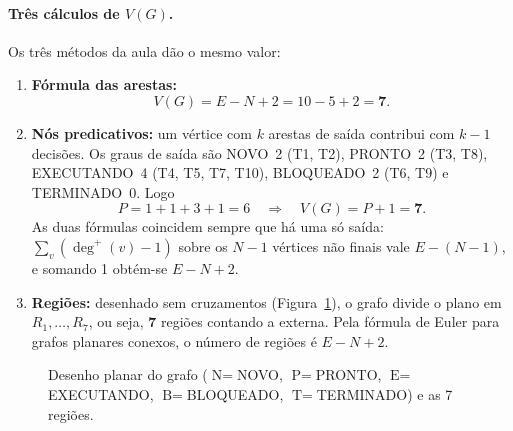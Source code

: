 \documentclass[11pt,a4paper]{article}
\theoremstyle{definition}
\newcommand{\est}[1]{\textsf{\small #1}}   %
\newcommand{\VG}{V(G)}
\begin{document}
\paragraph{Três cálculos de $\VG$.} Os três métodos da aula dão o mesmo valor:
\begin{enumerate}[label=(\roman*)]
  \item \textbf{Fórmula das arestas:}
        \[ \VG = E - N + 2 = 10 - 5 + 2 = \mathbf{7}. \]
  \item \textbf{Nós predicativos:} um vértice com $k$ arestas de saída contribui com $k-1$
        decisões. Os graus de saída são \est{NOVO}~2 (T1, T2), \est{PRONTO}~2 (T3, T8),
        \est{EXECUTANDO}~4 (T4, T5, T7, T10), \est{BLOQUEADO}~2 (T6, T9) e \est{TERMINADO}~0. Logo
        \[ P = 1 + 1 + 3 + 1 = 6 \quad\Longrightarrow\quad \VG = P + 1 = \mathbf{7}. \]
        As duas fórmulas coincidem sempre que há uma só saída: $\sum_v (\deg^+(v) - 1)$ sobre os
        $N-1$ vértices não finais vale $E - (N-1)$, e somando 1 obtém-se $E - N + 2$.
  \item \textbf{Regiões:} desenhado sem cruzamentos (Figura~\ref{fig:regioes}), o grafo divide o
        plano em $R_1, \ldots, R_7$, ou seja, \textbf{7} regiões contando a externa. Pela fórmula
        de Euler para grafos planares conexos, o número de regiões é $E - N + 2$.
\end{enumerate}

\begin{figure}[H]
\centering
{}
\caption{Desenho planar do grafo ($\text{N}=$\est{NOVO}, $\text{P}=$\est{PRONTO},
$\text{E}=$\est{EXECUTANDO}, $\text{B}=$\est{BLOQUEADO}, $\text{T}=$\est{TERMINADO}) e as 7 regiões.}
\label{fig:regioes}
\end{figure}
\end{document}
